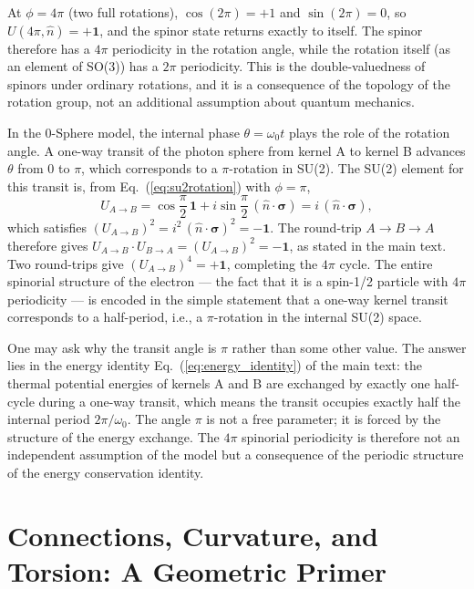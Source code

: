 \documentclass[%
 reprint,
 amsmath,amssymb,
 aps,
 prb,
]{revtex4-2}
\numberwithin{equation}{section}
\newcommand{\iphase}{\theta}  %
\begin{document}
At $\phi = 4\pi$ (two full rotations), $\cos(2\pi) = +1$ and $\sin(2\pi) = 0$, so $U(4\pi, \hat{n}) = +\mathbf{1}$, and the spinor state returns exactly to itself. The spinor therefore has a $4\pi$ periodicity in the rotation angle, while the rotation itself (as an element of SO(3)) has a $2\pi$ periodicity. This is the double-valuedness of spinors under ordinary rotations, and it is a consequence of the topology of the rotation group, not an additional assumption about quantum mechanics.

In the 0-Sphere model, the internal phase $\iphase = \omega_0 t$ plays the role of the rotation angle. A one-way transit of the photon sphere from kernel A to kernel B advances $\iphase$ from $0$ to $\pi$, which corresponds to a $\pi$-rotation in SU(2). The SU(2) element for this transit is, from Eq.~(\ref{eq:su2rotation}) with $\phi = \pi$,
\begin{equation}
U_{A\to B} = \cos\frac{\pi}{2}\,\mathbf{1} + i\sin\frac{\pi}{2}\,(\hat{n}\cdot\bm{\sigma}) = i\,(\hat{n}\cdot\bm{\sigma}),
\label{eq:uab_explicit}
\end{equation}
which satisfies $(U_{A\to B})^2 = i^2\,(\hat{n}\cdot\bm{\sigma})^2 = -\mathbf{1}$. The round-trip $A\to B\to A$ therefore gives $U_{A\to B}\cdot U_{B\to A} = (U_{A\to B})^2 = -\mathbf{1}$, as stated in the main text. Two round-trips give $(U_{A\to B})^4 = +\mathbf{1}$, completing the $4\pi$ cycle. The entire spinorial structure of the electron --- the fact that it is a spin-1/2 particle with $4\pi$ periodicity --- is encoded in the simple statement that a one-way kernel transit corresponds to a half-period, i.e., a $\pi$-rotation in the internal SU(2) space.

One may ask why the transit angle is $\pi$ rather than some other value. The answer lies in the energy identity Eq.~(\ref{eq:energy_identity}) of the main text: the thermal potential energies of kernels A and B are exchanged by exactly one half-cycle during a one-way transit, which means the transit occupies exactly half the internal period $2\pi/\omega_0$. The angle $\pi$ is not a free parameter; it is forced by the structure of the energy exchange. The $4\pi$ spinorial periodicity is therefore not an independent assumption of the model but a consequence of the periodic structure of the energy conservation identity.

\section{Connections, Curvature, and Torsion: A Geometric Primer}
\label{app:geometry}
\end{document}
